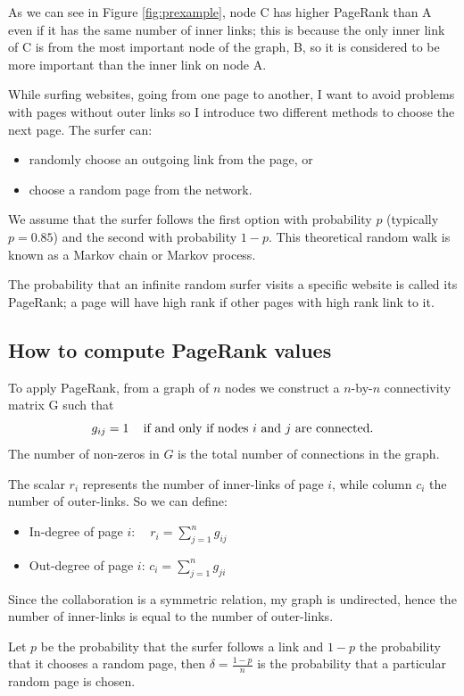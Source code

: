 \documentclass[]{usiinfbachelorproject}
\newcommand\tab[1][1cm]{\hspace*{#1}}
\begin{document}
As we can see in Figure \ref{fig:prexample}, node C has higher PageRank than A even if it has the same number of inner links; this is because the only inner link of C is from the most important node of the graph, B, so it is considered to be more important than the inner link on node A.

While surfing websites, going from one page to another, I want to avoid problems with pages without outer links so I introduce two different methods to choose the next page. The surfer can:
\begin{itemize}
\item randomly choose an outgoing link from the page, or
\item choose a random page from the network.
\end{itemize}
We assume that the surfer follows the first option with probability $p$ (typically $p=0.85$) and the second with probability $1-p$. This theoretical random walk is known as a Markov chain or Markov process.

The probability that an infinite random surfer visits a specific website is called its PageRank; a page will have high rank if other pages with high rank link to it.


\subsection{How to compute PageRank values}
To apply PageRank, from a graph of $n$ nodes we construct a $n$-by-$n$ connectivity matrix G such that
\begin{equation*}
g_{ij}=1 \text{\;\;\; if and only if nodes $i$ and $j$ are connected.} 
\end{equation*}
The number of non-zeros in $G$ is the total number of connections in the graph.

The scalar $r_i$ represents the number of inner-links of page $i$, while column $c_i$ the number of outer-links. So we can define:
\begin{itemize}
\item In-degree of page $i$: \tab $\:\:\:\:r_i = \sum\limits_{j=1}^{n} g_{ij}$
\item Out-degree of page $i$: \tab $c_i = \sum\limits_{j=1}^{n} g_{ji}$
\end{itemize}
Since the collaboration is a symmetric relation, my graph is undirected, hence the number of inner-links is equal to the number of outer-links. 

Let $p$ be the probability that the surfer follows a link and $1-p$ the probability that it chooses a random page, then $\delta = \frac{1-p}{n}$ is the probability that a particular random page is chosen.
\end{document}
